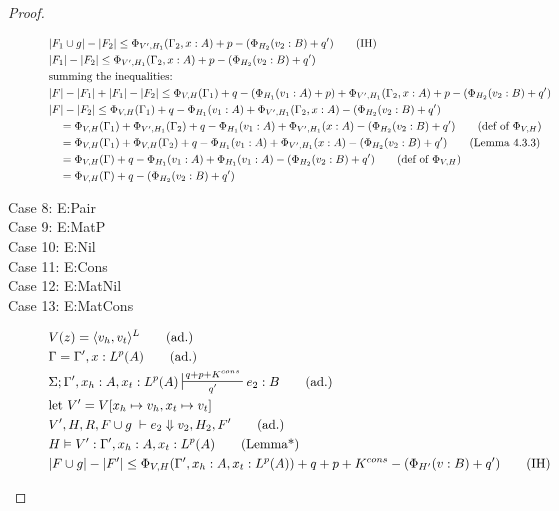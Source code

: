 \documentclass[11pt]{article}
\begin{document}
\begin{proof}
\begin{description}
\begin{align*}
   &|F_1 \cup g| - |F_2| \le  \Phi_{V',H_1}(\Gamma_2, x:A) +p - (\Phi_{H_2}(v_2:B) + q') \tag{IH}\\
   &|F_1| - |F_2| \le \Phi_{V',H_1}(\Gamma_2,x:A) + p - (\Phi_{H_2}(v_2:B) + q')\\
   &\text{summing the inequalities:}\\
   &|F| - |F_1| + |F_1| - |F_2| \le \Phi_{V,H}(\Gamma_1) +q - (\Phi_{H_1}(v_1:A) + p) + \Phi_{V',H_1}(\Gamma_2,x:A) + p - (\Phi_{H_2}(v_2:B) + q')\\
   &|F| - |F_2| \le \Phi_{V,H}(\Gamma_1) +q - \Phi_{H_1}(v_1:A) + \Phi_{V',H_1}(\Gamma_2,x:A) - (\Phi_{H_2}(v_2:B) + q')\\
   &\quad = \Phi_{V,H}(\Gamma_1) + \Phi_{V',H_1}(\Gamma_2) + q - \Phi_{H_1}(v_1:A) + \Phi_{V',H_1}(x:A) - (\Phi_{H_2}(v_2:B) + q') \tag{def of $\Phi_{V,H}$}\\
   &\quad = \Phi_{V,H}(\Gamma_1) + \Phi_{V,H}(\Gamma_2) + q - \Phi_{H_1}(v_1:A) + \Phi_{V',H_1}(x:A) - (\Phi_{H_2}(v_2:B) + q') \tag{Lemma 4.3.3}\\
   &\quad = \Phi_{V,H}(\Gamma) + q - \Phi_{H_1}(v_1:A) + \Phi_{H_1}(v_1:A) - (\Phi_{H_2}(v_2:B) + q') \tag{def of $\Phi_{V,H}$}\\
   &\quad = \Phi_{V,H}(\Gamma) + q - (\Phi_{H_2}(v_2:B) + q') \\
   \end{align*}
   \item[Case 8: E:Pair]
   \item[Case 9: E:MatP]
   \item[Case 10: E:Nil]
   \item[Case 11: E:Cons]
   \item[Case 12: E:MatNil]
   \item[Case 13: E:MatCons]
   \begin{align*}
   &V(z) = \pairexcst{v_h}{v_t}^L \tag{ad.}\\
   &\Gamma = \Gamma', x : L^p(A) \tag{ad.}\\
   &\Sigma; \Gamma', x_h : A, x_t : L^p(A) \sststile{q'}{q + p + K^{cons}} e_2 : B \tag{ad.}\\
   &\text{let } V' = V[x_h \mapsto v_h, x_t \mapsto v_t]\\
   &V',H,R,F \cup g \; \vdash e_2 \Downarrow v_2, H_2, F' \tag{ad.} \\
   &H \vDash V' : \Gamma', x_h : A, x_t : L^p(A) \tag{Lemma*}\\
   &|F \cup g| - |F'| \le  \Phi_{V,H}(\Gamma',x_h:A,x_t:L^p(A)) + q + p + K^{cons} - (\Phi_{H'}(v:B) + q') \tag{IH}\\

\end{align*}
\end{description}
\end{proof}
\end{document}
